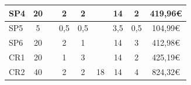 \documentclass[a4paper]{article}
\begin{document}
\begin{table}[H]
\begin{center}
\begin{tabular}{|l|c|c|c|c|c|c|c|c|}
            {\color[HTML]{000000} SP4}                                                             & {\color[HTML]{000000} 20}                                                               & {\color[HTML]{000000} }                   & {\color[HTML]{000000} 2}                & {\color[HTML]{000000} 2}             & {\color[HTML]{000000} }                 & {\color[HTML]{000000} 14}                 & {\color[HTML]{000000} 2}                & {\color[HTML]{000000} 419,96€}             \\ \hline
            {\color[HTML]{000000} SP5}                                                             & {\color[HTML]{000000} 5}                                                                & {\color[HTML]{000000} }                   & {\color[HTML]{000000} 0,5}              & {\color[HTML]{000000} 0,5}           & {\color[HTML]{000000} }                 & {\color[HTML]{000000} 3,5}                & {\color[HTML]{000000} 0,5}              & {\color[HTML]{000000} 104,99€}             \\ \hline
            {\color[HTML]{000000} SP6}                                                             & {\color[HTML]{000000} 20}                                                               & {\color[HTML]{000000} }                   & {\color[HTML]{000000} 2}                & {\color[HTML]{000000} 1}             & {\color[HTML]{000000} }                 & {\color[HTML]{000000} 14}                 & {\color[HTML]{000000} 3}                & {\color[HTML]{000000} 412,98€}             \\ \hline
            {\color[HTML]{000000} CR1}                                                             & {\color[HTML]{000000} 20}                                                               & {\color[HTML]{000000} }                   & {\color[HTML]{000000} 1}                & {\color[HTML]{000000} 3}             & {\color[HTML]{000000} }                 & {\color[HTML]{000000} 14}                 & {\color[HTML]{000000} 2}                & {\color[HTML]{000000} 425,19€}             \\ \hline
            {\color[HTML]{000000} CR2}                                                             & {\color[HTML]{000000} 40}                                                               & {\color[HTML]{000000} }                   & {\color[HTML]{000000} 2}                & {\color[HTML]{000000} 2}             & {\color[HTML]{000000} 18}               & {\color[HTML]{000000} 14}                 & {\color[HTML]{000000} 4}                & {\color[HTML]{000000} 824,32€}             \\ \hline

\end{tabular}
\end{center}
\end{table}
\end{document}
